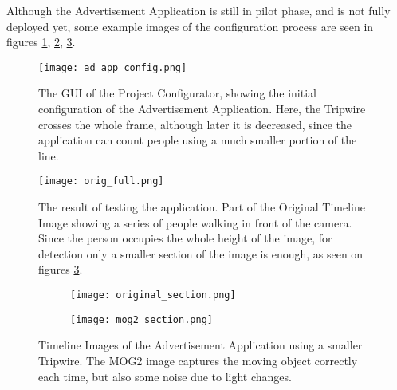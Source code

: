 Although the Advertisement Application is still in pilot phase, and is not fully deployed yet, some example images of the configuration process are seen in figures \ref{fig:adv_app_config}, \ref{fig:adv_app_full_orig}, \ref{fig:adv_app_counting}.

\begin{figure}[!h]
	\centering
	\texttt{[image: ad\_app\_config.png]}
	
	\caption[Initial configuration settings of the Advertisement Application]{The GUI of the Project Configurator, showing the initial configuration of the Advertisement Application. Here, the Tripwire crosses the whole frame, although later it is decreased, since the application can count people using a much smaller portion of the line.  \label{fig:adv_app_config}}
\end{figure}

\begin{figure}[!h]
	\centering
	\texttt{[image: orig\_full.png]}
	
	\caption[Test result of the Advertisement Application. (Whole height of the image is used.)]{The result of testing the application. Part of the Original Timeline Image showing a series of people walking in front of the camera. Since the person occupies the whole height of the image, for detection only a smaller section of the image is enough, as seen on figures \ref{fig:adv_app_counting}. \label{fig:adv_app_full_orig}}
\end{figure}

\begin{figure}[!h]
	\centering
	\begin{subfigure}[t]{0.6\textwidth}
	\texttt{[image: original\_section.png]}
	\end{subfigure}
	\hfill
	\begin{subfigure}[t]{0.6\textwidth}
		\texttt{[image: mog2\_section.png]}
	\end{subfigure}

	\caption[Test result of the Advertisement Application. (Only a small Tripwire section is used)]{Timeline Images of the Advertisement Application using a smaller Tripwire. The MOG2 image captures the moving object correctly each time, but also some noise due to light changes.\label{fig:adv_app_counting}}
\end{figure}

